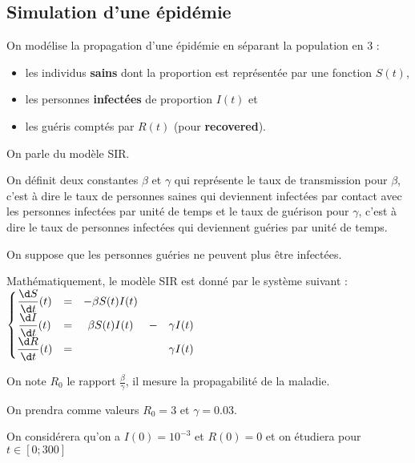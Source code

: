 \subsection{Simulation d'une épidémie}
On modélise la propagation d'une épidémie en séparant la population en 3 :
\begin{itemize}
    \item les individus {\bf sains} dont la proportion est représentée par une fonction $S(t)$,
    \item les personnes {\bf infectées} de proportion $I(t)$ et
    \item les guéris comptés par $R(t)$ (pour {\bf recovered}).
\end{itemize}
On parle du modèle SIR.

On définit deux constantes $\beta$ et $\gamma$ qui représente le taux de transmission pour $\beta$, c’est à dire le taux de personnes saines qui deviennent infectées par contact avec les personnes infectées par unité de temps et le taux de guérison pour $\gamma$, c’est à dire le taux de personnes infectées qui deviennent guéries par unité de temps. 

On suppose que les personnes guéries ne peuvent plus être infectées.

Mathématiquement, le modèle SIR est donné par le système suivant :
$\left\{\begin{matrix}
\displaystyle \frac{\d S}{\d t}(t)&=&-\beta S(t)I(t)&&\\ 
\displaystyle \frac{\d I}{\d t}(t)&=&\beta S(t)I(t)&-&\gamma I(t)\\ 
\displaystyle \frac{\d R}{\d t}(t)&=&&&\gamma I(t)\\ 
\end{matrix}\right.$

On note $R_0$ le rapport $\displaystyle \frac \beta\gamma$, il mesure la propagabilité de la maladie.

On prendra comme valeurs $R_0 = 3$ et $\gamma = 0.03$.

On considérera qu'on a $I(0) = 10^{-3}$ et $R(0) = 0$ et on étudiera pour $t\in [0;300]$

